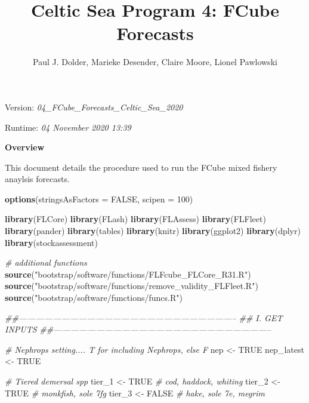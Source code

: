 \documentclass[
]{article}
\title{Celtic Sea Program 4: FCube Forecasts}
\author{Paul J. Dolder, Marieke Desender, Claire Moore, Lionel Pawlowski}
\date{}
\newenvironment{Shaded}{\begin{snugshade}}{\end{snugshade}}
\newcommand{\CommentTok}[1]{\textcolor[rgb]{0.56,0.35,0.01}{\textit{#1}}}
\newcommand{\DataTypeTok}[1]{\textcolor[rgb]{0.13,0.29,0.53}{#1}}
\newcommand{\DecValTok}[1]{\textcolor[rgb]{0.00,0.00,0.81}{#1}}
\newcommand{\KeywordTok}[1]{\textcolor[rgb]{0.13,0.29,0.53}{\textbf{#1}}}
\newcommand{\NormalTok}[1]{#1}
\newcommand{\OtherTok}[1]{\textcolor[rgb]{0.56,0.35,0.01}{#1}}
\newcommand{\StringTok}[1]{\textcolor[rgb]{0.31,0.60,0.02}{#1}}
\begin{document}
\maketitle

Version: \emph{04\_FCube\_Forecasts\_Celtic\_Sea\_2020}

Runtime: \emph{04 November 2020 13:39}

\textbf{Overview}

This document details the procedure used to run the FCube mixed fishery
anaylsis forecasts.

\begin{Shaded}
\begin{Highlighting}[]
\KeywordTok{options}\NormalTok{(}\DataTypeTok{stringsAsFactors =} \OtherTok{FALSE}\NormalTok{, }\DataTypeTok{scipen =} \DecValTok{100}\NormalTok{)}

\KeywordTok{library}\NormalTok{(FLCore)}
\KeywordTok{library}\NormalTok{(FLash)}
\KeywordTok{library}\NormalTok{(FLAssess)}
\KeywordTok{library}\NormalTok{(FLFleet)}
\KeywordTok{library}\NormalTok{(pander)}
\KeywordTok{library}\NormalTok{(tables)}
\KeywordTok{library}\NormalTok{(knitr)}
\KeywordTok{library}\NormalTok{(ggplot2)}
\KeywordTok{library}\NormalTok{(dplyr)}
\KeywordTok{library}\NormalTok{(stockassessment)}

\CommentTok{# additional functions}
\KeywordTok{source}\NormalTok{(}\StringTok{"bootstrap/software/functions/FLFcube_FLCore_R31.R"}\NormalTok{)}
\KeywordTok{source}\NormalTok{(}\StringTok{"bootstrap/software/functions/remove_validity_FLFleet.R"}\NormalTok{)}
\KeywordTok{source}\NormalTok{(}\StringTok{"bootstrap/software/functions/funcs.R"}\NormalTok{)}


\CommentTok{##-----------------------------------------------------------------------------}
\CommentTok{## I. GET INPUTS}
\CommentTok{##-----------------------------------------------------------------------------}


\CommentTok{# Nephrops setting.... T for including Nephrops, else F}
\NormalTok{nep <-}\StringTok{ }\OtherTok{TRUE}
\NormalTok{nep_latest <-}\StringTok{ }\OtherTok{TRUE}

\CommentTok{# Tiered demersal spp}
\NormalTok{tier_}\DecValTok{1}\NormalTok{ <-}\StringTok{ }\OtherTok{TRUE}  \CommentTok{# cod, haddock, whiting}
\NormalTok{tier_}\DecValTok{2}\NormalTok{ <-}\StringTok{ }\OtherTok{TRUE}  \CommentTok{# monkfish, sole 7fg}
\NormalTok{tier_}\DecValTok{3}\NormalTok{ <-}\StringTok{ }\OtherTok{FALSE}  \CommentTok{# hake, sole 7e, megrim}


\end{Highlighting}
\end{Shaded}
\end{document}

